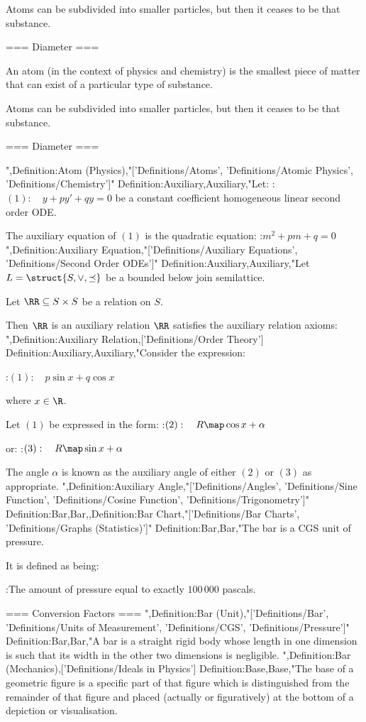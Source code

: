 Atoms can be subdivided into smaller particles, but then it ceases to be that substance.


=== Diameter ===

An atom (in the context of physics and chemistry) is the smallest piece of matter that can exist of a particular type of substance.


Atoms can be subdivided into smaller particles, but then it ceases to be that substance.


=== Diameter ===

",Definition:Atom (Physics),"['Definitions/Atoms', 'Definitions/Atomic Physics', 'Definitions/Chemistry']"
Definition:Auxiliary,Auxiliary,"Let:
:$(1): \quad y + p y' + q y = 0$
be a constant coefficient homogeneous linear second order ODE.


The auxiliary equation of $(1)$ is the quadratic equation:
:$m^2 + p m + q = 0$",Definition:Auxiliary Equation,"['Definitions/Auxiliary Equations', 'Definitions/Second Order ODEs']"
Definition:Auxiliary,Auxiliary,"Let $L = \struct {S, \vee, \preceq}$ be a bounded below join semilattice.

Let $\RR \subseteq S \times S$ be a relation on $S$.


Then $\RR$ is an auxiliary relation  $\RR$ satisfies the auxiliary relation axioms:
",Definition:Auxiliary Relation,['Definitions/Order Theory']
Definition:Auxiliary,Auxiliary,"Consider the expression:

:$(1): \quad p \sin x + q \cos x$

where $x \in \R$.

Let $(1)$ be expressed in the form:
:$(2): \quad R \map \cos {x + \alpha}$

or:
:$(3): \quad R \map \sin {x + \alpha}$


The angle $\alpha$ is known as the auxiliary angle of either $(2)$ or $(3)$ as appropriate.
",Definition:Auxiliary Angle,"['Definitions/Angles', 'Definitions/Sine Function', 'Definitions/Cosine Function', 'Definitions/Trigonometry']"
Definition:Bar,Bar,,Definition:Bar Chart,"['Definitions/Bar Charts', 'Definitions/Graphs (Statistics)']"
Definition:Bar,Bar,"The bar is a CGS unit of pressure.


It is defined as being:

:The amount of pressure equal to exactly $100 \, 000$ pascals.


=== Conversion Factors ===
",Definition:Bar (Unit),"['Definitions/Bar', 'Definitions/Units of Measurement', 'Definitions/CGS', 'Definitions/Pressure']"
Definition:Bar,Bar,"A bar is a straight rigid body whose length in one dimension is such that its width in the other two dimensions is negligible.
",Definition:Bar (Mechanics),['Definitions/Ideals in Physics']
Definition:Base,Base,"The base of a geometric figure is a specific part of that figure which is distinguished from the remainder of that figure and placed (actually or figuratively) at the bottom of a depiction or visualisation.

